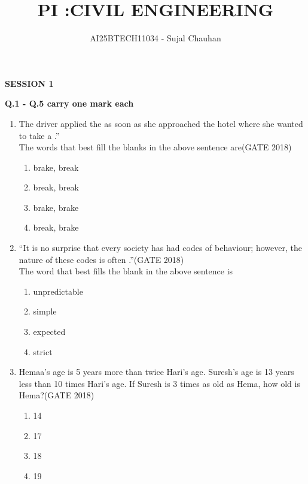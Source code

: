 \documentclass[journal,12pt,onecolumn]{IEEEtran}
\theoremstyle{remark}
\begin{document}
\title{PI :CIVIL ENGINEERING}
\author{AI25BTECH11034 - Sujal Chauhan}
\maketitle
\renewcommand{\thefigure}{\theenumi}
\renewcommand{\thetable}{\theenumi}

    
\begin{center}
    

\vspace{6cm}
\textbf{\LARGE SESSION 1}
\end{center}
\newpage
\textbf{\large Q.1 - Q.5 carry one mark each}
\begin{enumerate}
\item The driver applied the \underline{\hspace{2cm}} as soon as she approached the hotel where she wanted to take a \underline{\hspace{2cm}}.''
\\The words that best fill the blanks in the above sentence are\hfill{(GATE 2018)}
\begin{multicols}{4}
\begin{enumerate}
    \item brake, break
    \item break, break
    \item brake, brake
    \item break, brake
\end{enumerate}
\end{multicols}
\vspace{1cm}

\item ``It is no surprise that every society has had codes of behaviour; however, the nature of these codes is often \underline{\hspace{2cm}}.''\hfill{(GATE 2018)}
\\The word that best fills the blank in the above sentence is
\begin{multicols}{4}
\begin{enumerate}
    \item unpredictable
    \item simple
    \item expected
    \item strict
\end{enumerate}
\end{multicols}
\vspace{1cm}

\item Hemaa's age is 5 years more than twice Hari's age. Suresh's age is 13 years less than 10 times Hari's age. If Suresh is 3 times as old as Hema, how old is Hema?\hfill{(GATE 2018)}
\begin{multicols}{4}
\begin{enumerate}
    \item 14
    \item 17
    \item 18
    \item 19
\end{enumerate}
\end{multicols}
\vspace{1cm}


\end{enumerate}
\end{document}
